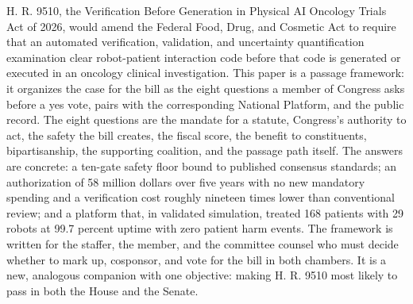 H. R. 9510, the Verification Before Generation in Physical AI Oncology Trials Act of
2026, would amend the Federal Food, Drug, and Cosmetic Act to require that an
automated verification, validation, and uncertainty quantification examination clear
robot-patient interaction code before that code is generated or executed in an
oncology clinical investigation. This paper is a passage framework: it organizes the
case for the bill as the eight questions a member of Congress asks before a yes vote, pairs with the corresponding National
Platform, and the public record. The
eight questions are the mandate for a statute, Congress's authority to act, the
safety the bill creates, the fiscal score, the benefit to constituents,
bipartisanship, the supporting coalition, and the passage path itself. The answers
are concrete: a ten-gate safety floor bound to published consensus standards; an
authorization of 58 million dollars over five years with no new mandatory spending
and a verification cost roughly nineteen times lower than conventional review; and a
platform that, in validated simulation, treated 168 patients with 29 robots at 99.7
percent uptime with zero patient harm events. The framework is written for the
staffer, the member, and the committee counsel who must decide whether to mark up,
cosponsor, and vote for the bill in both chambers. It is a new, analogous
companion with one objective: making H. R. 9510 most likely to pass in both the
House and the Senate.
